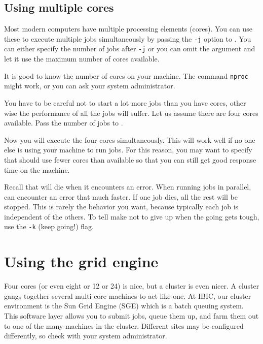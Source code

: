 \subsection{Using multiple cores}

Most modern computers have multiple processing elements (cores). You can use these to execute multiple jobs simultaneously by passing the \texttt{-j} option to \maken. You can either specify the number of jobs after \texttt{-j} or you can omit the argument and let it use the maximum number of cores available. 

It is good to know the number of cores on your machine. The command \texttt{nproc} might work, or you can ask your system administrator. 

You have to be careful not to start a lot more jobs than you have cores, other wise the performance of all the jobs will suffer. Let us assume there are four cores available. Pass the number of jobs to \maken. 

Now you will execute the four cores simultaneously. This will work well if no one else is using your machine to run jobs. For this reason, you may want to specify that \maken{} should use fewer cores than available so that you can still get good response time on the machine. 

Recall that \maken{} will die when it encounters an error. When running jobs in parallel, \maken{} can encounter an error that much faster. If one job dies, all the rest will be stopped. This is rarely the behavior you want, because typically each job is independent of the others. To tell make not to give up when the going gets tough, use the \texttt{-k} (keep going!) flag.

\section{Using the grid engine}

Four cores (or even eight or 12 or 24) is nice, but a cluster is even nicer. A cluster gangs together several multi-core machines to act like one. At IBIC, our cluster environment is the Sun Grid Engine (SGE) which is a batch queuing system. This software layer allows you to submit jobs, queue them up, and farm them out to one of the many machines in the cluster. Different sites may be configured differently, so check with your system administrator. 

